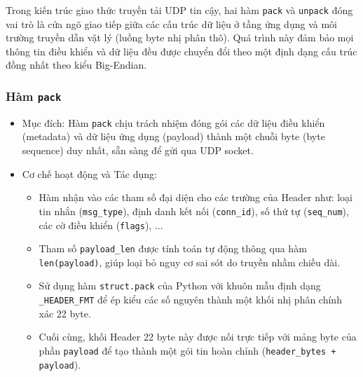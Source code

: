 Trong kiến trúc giao thức truyền tải UDP tin cậy, hai hàm \texttt{pack} và \texttt{unpack} đóng vai trò là cửa ngõ giao tiếp giữa các cấu trúc dữ liệu ở tầng ứng dụng và môi trường truyền dẫn vật lý (luồng byte nhị phân thô). Quá trình này đảm bảo mọi thông tin điều khiển và dữ liệu đều được chuyển đổi theo một định dạng cấu trúc đồng nhất theo kiểu Big-Endian.

\subsubsection{Hàm \texttt{pack}}
\begin{itemize}
    \item Mục đích: Hàm \texttt{pack} chịu trách nhiệm đóng gói các dữ liệu điều khiển (metadata) và dữ liệu ứng dụng (payload) thành một chuỗi byte (byte sequence) duy nhất, sẵn sàng để gửi qua UDP socket.
    \item Cơ chế hoạt động và Tác dụng:
    \begin{itemize}
        \item Hàm nhận vào các tham số đại diện cho các trường của Header như: loại tin nhắn (\texttt{msg\_type}), định danh kết nối (\texttt{conn\_id}), số thứ tự (\texttt{seq\_num}), các cờ điều khiển (\texttt{flags}), ...
        \item Tham số \texttt{payload\_len} được tính toán tự động thông qua hàm \texttt{len(payload)}, giúp loại bỏ nguy cơ sai sót do truyền nhầm chiều dài.
        \item Sử dụng hàm \texttt{struct.pack} của Python với khuôn mẫu định dạng \texttt{\_HEADER\_FMT} để ép kiểu các số nguyên thành một khối nhị phân chính xác 22 byte.
        \item Cuối cùng, khối Header 22 byte này được nối trực tiếp với mảng byte của phần \texttt{payload} để tạo thành một gói tin hoàn chỉnh (\texttt{header\_bytes + payload}).
    \end{itemize}
\end{itemize}

